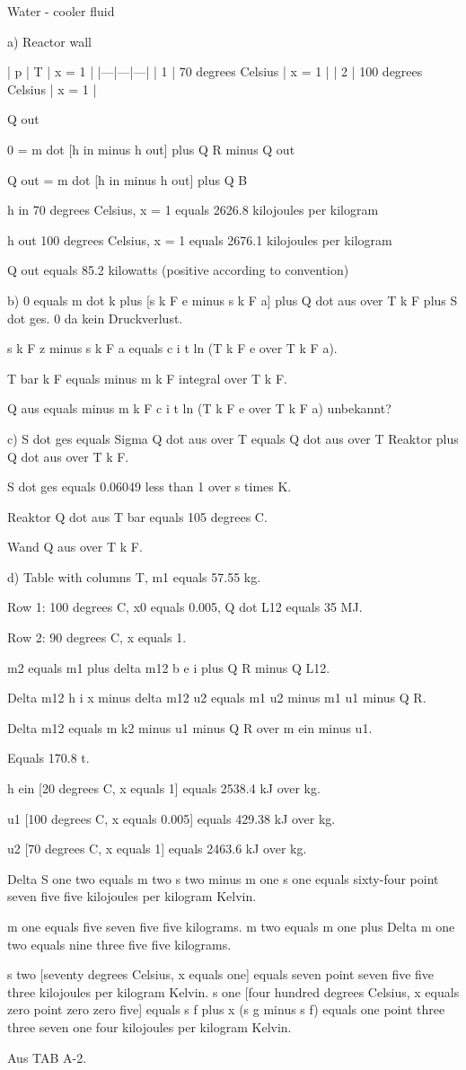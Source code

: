 Water - cooler fluid

a) Reactor wall

| p | T | x = 1 |
|---|---|---|
| 1 | 70 degrees Celsius | x = 1 |
| 2 | 100 degrees Celsius | x = 1 |

Q out

0 = m dot [h in minus h out] plus Q R minus Q out

Q out = m dot [h in minus h out] plus Q B

h in {70 degrees Celsius, x = 1} equals 2626.8 kilojoules per kilogram

h out {100 degrees Celsius, x = 1} equals 2676.1 kilojoules per kilogram

Q out equals 85.2 kilowatts (positive according to convention)

b) 0 equals m dot k plus [s k F e minus s k F a] plus Q dot aus over T k F plus S dot ges. 0 da kein Druckverlust.

s k F z minus s k F a equals c i t ln (T k F e over T k F a).

T bar k F equals minus m k F integral over T k F.

Q aus equals minus m k F c i t ln (T k F e over T k F a) unbekannt?

c) S dot ges equals Sigma Q dot aus over T equals Q dot aus over T Reaktor plus Q dot aus over T k F.

S dot ges equals 0.06049 less than 1 over s times K.

Reaktor Q dot aus T bar equals 105 degrees C.

Wand Q aus over T k F.

d) Table with columns T, m1 equals 57.55 kg.

Row 1: 100 degrees C, x0 equals 0.005, Q dot L12 equals 35 MJ.

Row 2: 90 degrees C, x equals 1.

m2 equals m1 plus delta m12 b e i plus Q R minus Q L12.

Delta m12 h i x minus delta m12 u2 equals m1 u2 minus m1 u1 minus Q R.

Delta m12 equals m k2 minus u1 minus Q R over m ein minus u1.

Equals 170.8 t.

h ein [20 degrees C, x equals 1] equals 2538.4 kJ over kg.

u1 [100 degrees C, x equals 0.005] equals 429.38 kJ over kg.

u2 [70 degrees C, x equals 1] equals 2463.6 kJ over kg.

Delta S one two equals m two s two minus m one s one equals sixty-four point seven five five kilojoules per kilogram Kelvin.

m one equals five seven five five kilograms.  
m two equals m one plus Delta m one two equals nine three five five kilograms.

s two [seventy degrees Celsius, x equals one] equals seven point seven five five three kilojoules per kilogram Kelvin.  
s one [four hundred degrees Celsius, x equals zero point zero zero five] equals s f plus x (s g minus s f) equals one point three three seven one four kilojoules per kilogram Kelvin.

Aus TAB A-2.